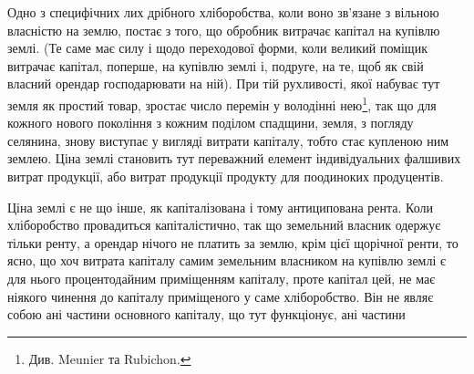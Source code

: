 Одно з специфічних лих дрібного хліборобства, коли воно зв’язане з вільною
власністю на землю, постає з того, що обробник витрачає капітал на купівлю
землі. (Те саме має силу і щодо переходової форми, коли великий поміщик
витрачає капітал, поперше, на купівлю землі і, подруге, на те, щоб як
свій власний орендар господарювати на ній). При тій рухливості, якої набуває
тут земля як простий товар, зростає число перемін у володінні нею\footnote{Див. Meunier та Rubichon.}, так що
для кожного нового покоління з кожним поділом спадщини, земля, з погляду
селянина, знову виступає у вигляді витрати капіталу, тобто стає купленою
ним землею. Ціна землі становить тут переважний елемент індивідуальних фалшивих
витрат продукції, або витрат продукції продукту для поодиноких продуцентів.

Ціна землі є не що інше, як капіталізована і тому антиципована рента.
Коли хліборобство провадиться капіталістично, так що земельний власник одержує
тільки ренту, а орендар нічого не платить за землю, крім цієї щорічної
ренти, то ясно, що хоч витрата капіталу самим земельним власником на купівлю
землі є для нього процентодайним приміщенням капіталу, проте капітал
цей, не має ніякого чинення до капіталу приміщеного у саме хліборобство. Він
не являє собою ані частини основного капіталу, що тут функціонує, ані частини
\parbreak{}  %
